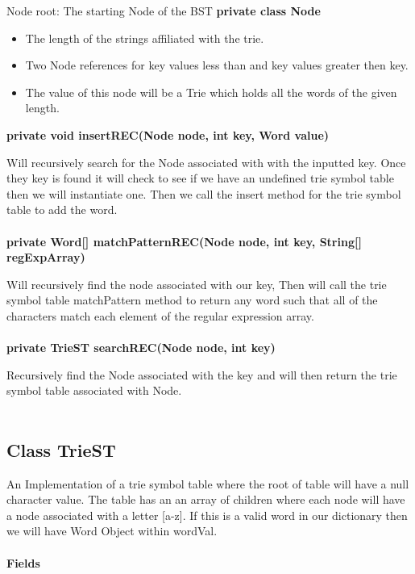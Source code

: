 \documentclass[11pt]{article}
\begin{document}
Node root: The starting Node of the BST
\textbf{private class Node\\}
\begin{itemize}
	\item The length of the strings affiliated with the trie.
	\item Two Node references for key values less than and key values greater then key.
	\item The value of this node will be a Trie which holds all the words of the given length.
\end{itemize}

\textbf{private void insertREC(Node node, int key, Word value)\\}

Will recursively search for the Node associated with with the inputted key. Once they key is found it will check to see if we have an undefined trie symbol table then we will instantiate one. Then we call the insert method for the trie symbol table to add the word.\\\\
\textbf{private Word[] matchPatternREC(Node node, int key, String[] regExpArray)\\}

Will recursively find the node associated with our key, Then will call the trie symbol table matchPattern method to return any word such that all of the characters match each element of the regular expression array. \\\\
\textbf{private TrieST searchREC(Node node, int key)\\}

Recursively find the Node associated with the key and will then return the trie symbol table associated with Node.\\\\
\subsection{Class TrieST}

An Implementation of a trie symbol table where the root of table will have a null character value. The table has an an array of children where each node will have a node associated with a letter  [a-z]. If this is a valid word in our dictionary then we will have Word Object within wordVal.\\\\
\textbf{Fields\\}
\end{document}
